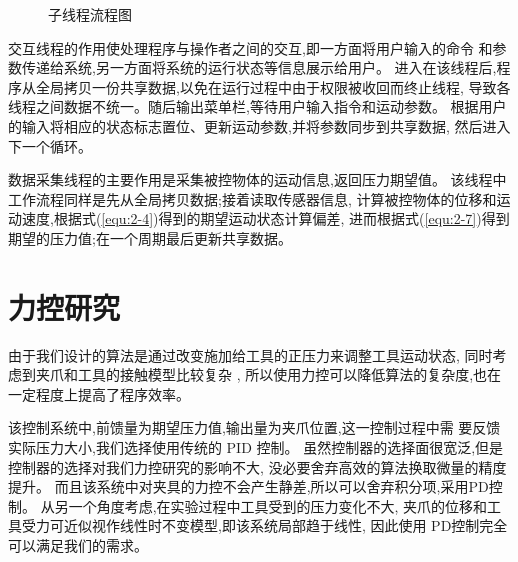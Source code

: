 \begin{figure}[!ht]
{    }
    \hspace{25pt}
  \caption{子线程流程图}
  \label{fig:3-2}
  \vspace{-0.3cm}
\end{figure}

交互线程的作用使处理程序与操作者之间的交互,即一方面将用户输入的命令
和参数传递给系统,另一方面将系统的运行状态等信息展示给用户。
进入在该线程后,程序从全局拷贝一份共享数据,以免在运行过程中由于权限被收回而终止线程,
导致各线程之间数据不统一。随后输出菜单栏,等待用户输入指令和运动参数。
根据用户的输入将相应的状态标志置位、更新运动参数,并将参数同步到共享数据,
然后进入下一个循环。

数据采集线程的主要作用是采集被控物体的运动信息,返回压力期望值。
该线程中工作流程同样是先从全局拷贝数据;接着读取传感器信息,
计算被控物体的位移和运动速度,根据式(\ref{equ:2-4})得到的期望运动状态计算偏差,
进而根据式(\ref{equ:2-7})得到期望的压力值;在一个周期最后更新共享数据。


\section{力控研究}
由于我们设计的算法是通过改变施加给工具的正压力来调整工具运动状态,
同时考虑到夹爪和工具的接触模型比较复杂 \cite{ref11} ,
所以使用力控可以降低算法的复杂度,也在一定程度上提高了程序效率。

该控制系统中,前馈量为期望压力值,输出量为夹爪位置,这一控制过程中需
要反馈实际压力大小,我们选择使用传统的 PID 控制。
虽然控制器的选择面很宽泛,但是控制器的选择对我们力控研究的影响不大,
没必要舍弃高效的算法换取微量的精度提升。
而且该系统中对夹具的力控不会产生静差,所以可以舍弃积分项,采用PD控制。
从另一个角度考虑,在实验过程中工具受到的压力变化不大,
夹爪的位移和工具受力可近似视作线性时不变模型,即该系统局部趋于线性,
因此使用 PD控制完全可以满足我们的需求。

